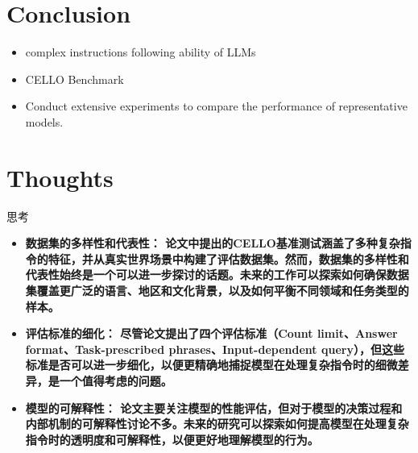 \documentclass{beamer}
\begin{document}
\begin{frame}
    
\end{frame}

\section{Conclusion}

\begin{frame}
    \begin{itemize}
        \item {complex instructions following ability of LLMs}
        \item {CELLO Benchmark}
        \item {Conduct extensive experiments to compare the performance of representative models.}
    \end{itemize}
\end{frame}

\section{Thoughts}

\begin{frame}{思考}
    \begin{itemize}
        \item {\bfseries{数据集的多样性和代表性：}\normalfont
            论文中提出的CELLO基准测试涵盖了多种复杂指令的特征，并从真实世界场景中构建了评估数据集。然而，数据集的多样性和代表性始终是一个可以进一步探讨的话题。未来的工作可以探索如何确保数据集覆盖更广泛的语言、地区和文化背景，以及如何平衡不同领域和任务类型的样本。}
        \item {\bfseries{评估标准的细化：}\normalfont
            尽管论文提出了四个评估标准（Count limit、Answer format、Task-prescribed phrases、Input-dependent query），但这些标准是否可以进一步细化，以便更精确地捕捉模型在处理复杂指令时的细微差异，是一个值得考虑的问题。}
        \item {\bfseries{模型的可解释性：}\normalfont
            论文主要关注模型的性能评估，但对于模型的决策过程和内部机制的可解释性讨论不多。未来的研究可以探索如何提高模型在处理复杂指令时的透明度和可解释性，以便更好地理解模型的行为。}
    \end{itemize}
\end{frame}
\end{document}
